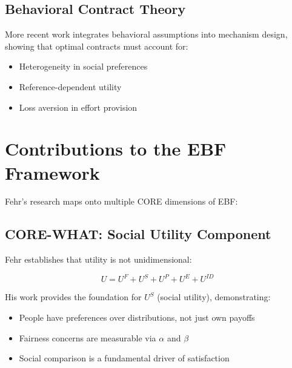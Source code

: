 \subsection{Behavioral Contract Theory}
\label{sec:feh-contracts}

More recent work \citep{fehr2007competition} integrates behavioral assumptions
into mechanism design, showing that optimal contracts must account for:
\begin{itemize}[nosep]
    \item Heterogeneity in social preferences
    \item Reference-dependent utility
    \item Loss aversion in effort provision
\end{itemize}


\section{Contributions to the EBF Framework}
\label{sec:feh-ebf}

Fehr's research maps onto multiple CORE dimensions of EBF:

\subsection{CORE-WHAT: Social Utility Component}

Fehr establishes that utility is not unidimensional:

\begin{equation}
U = U^F + U^S + U^P + U^E + U^{ID}
\end{equation}

His work provides the foundation for $U^S$ (social utility), demonstrating:
\begin{itemize}[nosep]
    \item People have preferences over distributions, not just own payoffs
    \item Fairness concerns are measurable via $\alpha$ and $\beta$
    \item Social comparison is a fundamental driver of satisfaction
\end{itemize}

